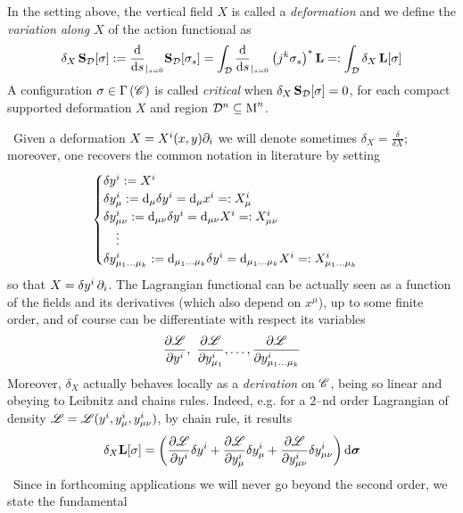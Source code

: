 \begin{defi}
        In the setting above, the vertical field $X$ is called a \emph{deformation} and we define the \emph{variation along $X$} of the action functional as
        $$\delta_X\,\mathbf{S}_{\mathcal{D}}[\sigma]:={\frac{\text{\normalfont d}}{\text{\normalfont d} s}}_{|_{s=0}}\mathbf{S}_{\mathcal{D}}[\sigma_s]=\int_{\mathcal{D}}{\frac{\text{\normalfont d}}{\text{\normalfont d} s}}_{|_{s=0}}\left(j^k\sigma_s\right)^*\mathbf{L}=:\int_{\mathcal{D}}\delta_X\,\mathbf{L}[\sigma]$$
        A configuration $\sigma\in\Gamma\left(\mathscr{C}\right)$ is called \emph{critical} when $\delta_X\,\mathbf{S}_{\mathcal{D}}[\sigma]=0$, for each compact supported deformation $X$ and region $\mathcal{D}^n\subseteq\text{\normalfont M}^n$.
\end{defi}
\,\newline
Given a deformation $X=X^i(x,y)\partial_i$ we will denote sometimes $\delta_X=\frac{\delta}{\delta X}$; moreover, one recovers the common notation in literature by setting 
$$\begin{cases}
    \delta y^i:=X^i\\
    \delta y^i_\mu:=\text{\normalfont d}_\mu\delta y^i=\text{\normalfont d}_\mu x^i=:X^i_\mu\\
    \delta y^i_{\mu\nu}:=\text{\normalfont d}_{\mu\nu}\delta y^i=\text{\normalfont d}_{\mu\nu}X^i=:X^i_{\mu\nu}\\
    \quad\vdots\\
    \delta y^i_{\mu_1\hdots\mu_k}:=\text{\normalfont d}_{\mu_1\hdots\mu_k}\delta y^i=\text{\normalfont d}_{\mu_1\hdots\mu_k}X^i=:X^i_{\mu_1\hdots\mu_k}
\end{cases}$$
so that $X=\delta y^i\,\partial_i$. The Lagrangian functional can be actually seen as a function of the fields and its derivatives (which also depend on $x^\mu$), up to some finite order, and of course can be differentiate with respect its variables 
$$\frac{\partial\mathscr{L}}{\partial y^i},\,\,\frac{\partial\mathscr{L}}{\partial y^i_{\mu_1}},\hdots,\frac{\partial\mathscr{L}}{\partial y^i_{\mu_1\hdots\mu_k}}$$
Moreover, $\delta_X$ actually behaves locally as a \emph{derivation} on $\mathscr{C}$, being so linear and obeying to Leibnitz and chains rules. Indeed, e.g. for a $2$--nd order Lagrangian of density $\mathscr{L}=\mathscr{L}(y^i,y^i_\mu,y^i_{\mu\nu})$, by chain rule, it results
\begin{equation}\label{Lagr_var}
    \delta_X\mathbf{L}[\sigma]=\left(\frac{\partial\mathscr{L}}{\partial y^i}\delta y^i+\frac{\partial\mathscr{L}}{\partial y^i_\mu}\delta y^i_\mu+\frac{\partial\mathscr{L}}{\partial y^i_{\mu\nu}}\delta y^i_{\mu\nu}\right)\text{\normalfont d}\boldsymbol{\sigma}
\end{equation}
\,\newline
Since in forthcoming applications we will never go beyond the second order, we state the fundamental

